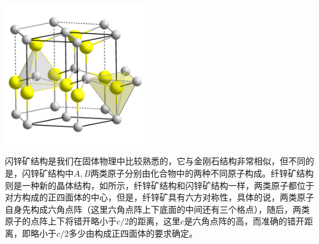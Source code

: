 \begin{Figure}[纤锌矿结构]
    \vspace{-0.5cm}
    \includegraphics[width=6cm]{image/Wurtzite_polyhedra.png}
    \vspace{-0.5cm}
\end{Figure}

闪锌矿结构是我们在固体物理中比较熟悉的，它与金刚石结构非常相似，但不同的是，闪锌矿结构中$A,B$两类原子分别由化合物中的两种不同原子构成。纤锌矿结构则是一种新的晶体结构，如所示\cite{W1}，纤锌矿结构和闪锌矿结构一样，两类原子都位于对方构成的正四面体的中心，但是，纤锌矿具有六方对称性，具体的说，两类原子自身先构成六角点阵（这里六角点阵上下底面的中间还有三个格点），随后，两类原子的点阵上下将错开略小于$c/2$的距离，这里$c$是六角点阵的高，而准确的错开距离，即略小于$c/2$多少由构成正四面体的要求确定。